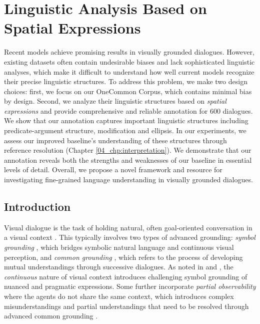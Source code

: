 \graphicspath{{05_analysis/figures/}} %

\chapter{Linguistic Analysis Based on Spatial Expressions}
\label{05_chp:analysis}

Recent models achieve promising results in visually grounded dialogues. However, existing datasets often contain undesirable biases and lack sophisticated linguistic analyses, which make it difficult to understand how well current models recognize their precise linguistic structures. To address this problem, we make two design choices: first, we focus on our OneCommon Corpus, which contains minimal bias by design. Second, we analyze their linguistic structures based on \textit{spatial expressions} and provide comprehensive and reliable annotation for 600 dialogues. We show that our annotation captures important linguistic structures including predicate-argument structure, modification and ellipsis. In our experiments, we assess our improved baseline's understanding of these structures through reference resolution (Chapter \ref{04_chp:interpretation}). We demonstrate that our annotation reveals both the strengths and weaknesses of our baseline in essential levels of detail. Overall, we propose a novel framework and resource for investigating fine-grained language understanding in visually grounded dialogues.

\section{Introduction}
\label{05_sec:introduction}

Visual dialogue is the task of holding natural, often goal-oriented conversation in a visual context \citep{das2017visual,de2017guesswhat}. This typically involves two types of advanced grounding: \textit{symbol grounding} \citep{harnad1990symbol}, which bridges symbolic natural language and continuous visual perception, and \textit{common grounding} \citep{clark1996using}, which refers to the process of developing mutual understandings through successive dialogues. As noted in \citet{monroe2017colors} and \citet{udagawa2019natural}, the \textit{continuous} nature of visual context introduces challenging symbol grounding of nuanced and pragmatic expressions. Some further incorporate \textit{partial observability} where the agents do not share the same context, which introduces complex misunderstandings and partial understandings that need to be resolved through advanced common grounding \citep{udagawa2019natural,haber-etal-2019-photobook}.

